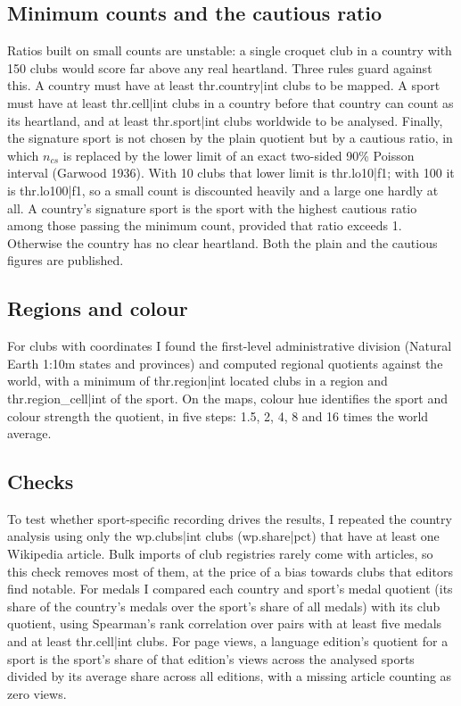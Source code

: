 \documentclass[11pt,a4paper]{article}
\begin{document}
\subsection{Minimum counts and the cautious ratio}

Ratios built on small counts are unstable: a single croquet club in a country with 150 clubs would score far above any real heartland. Three rules guard against this. A country must have at least {{thr.country|int}} clubs to be mapped. A sport must have at least {{thr.cell|int}} clubs in a country before that country can count as its heartland, and at least {{thr.sport|int}} clubs worldwide to be analysed. Finally, the signature sport is not chosen by the plain quotient but by a cautious ratio, in which $n_{cs}$ is replaced by the lower limit of an exact two-sided 90\% Poisson interval (Garwood 1936). With 10 clubs that lower limit is {{thr.lo10|f1}}; with 100 it is {{thr.lo100|f1}}, so a small count is discounted heavily and a large one hardly at all. A country's signature sport is the sport with the highest cautious ratio among those passing the minimum count, provided that ratio exceeds 1. Otherwise the country has no clear heartland. Both the plain and the cautious figures are published.

\subsection{Regions and colour}

For clubs with coordinates I found the first-level administrative division (Natural Earth 1:10m states and provinces) and computed regional quotients against the world, with a minimum of {{thr.region|int}} located clubs in a region and {{thr.region_cell|int}} of the sport. On the maps, colour hue identifies the sport and colour strength the quotient, in five steps: 1.5, 2, 4, 8 and 16 times the world average.

\subsection{Checks}

To test whether sport-specific recording drives the results, I repeated the country analysis using only the {{wp.clubs|int}} clubs ({{wp.share|pct}}) that have at least one Wikipedia article. Bulk imports of club registries rarely come with articles, so this check removes most of them, at the price of a bias towards clubs that editors find notable. For medals I compared each country and sport's medal quotient (its share of the country's medals over the sport's share of all medals) with its club quotient, using Spearman's rank correlation over pairs with at least five medals and at least {{thr.cell|int}} clubs. For page views, a language edition's quotient for a sport is the sport's share of that edition's views across the analysed sports divided by its average share across all editions, with a missing article counting as zero views.
\end{document}
